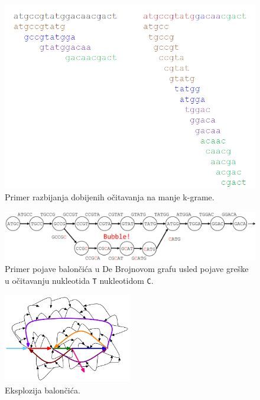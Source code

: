 \begin{figure}[H]
	\centering
	\includegraphics[width=\textwidth]{poglavlja/3/slike/razbijanje_na_manje_kgrame.png}
	\caption{Primer razbijanja dobijenih očitavanja na manje k-grame.}
	\label{slika:manji kgrami}
\end{figure}

\begin{figure}[H]
	\centering
	\includegraphics[width=\textwidth]{poglavlja/3/slike/baloncic.png}
	\caption{Primer pojave balon\v ci\'ca u De Brojnovom grafu usled pojave gre\v ske u o\v citavanju nukleotida \texttt{T} nukleotidom \texttt{C}.}
	\label{slika:baloncic}
\end{figure} 

\begin{figure}[H]
	\centering
	\includegraphics[width=0.5\textwidth]{poglavlja/3/slike/eksplozija-baloncica.png}
	\caption{Eksplozija balon\v ci\'ca.}
	\label{slika:eksplozija baloncica}
\end{figure}

